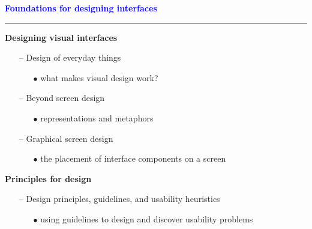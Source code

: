 \documentclass[pdf]{beamer}
\begin{document}
{{{{{{{{
\begin{frame}
	\vspace{8mm}
	\textcolor{Blue}{\textbf{\Large{Foundations for designing interfaces}}}
    \textcolor{red}{\rule{10cm}{1mm}}
    
    \bigskip
    \textbf {Designing visual interfaces}

    \begin{itemize}
    	\item[{--}] Design of everyday things
        \begin{itemize}
        	\item[{$\bullet$}] what makes visual design work?
     	\end{itemize}
        \item[{--}] Beyond screen design
         \begin{itemize}
        	\item[{$\bullet$}] representations and metaphors
     	\end{itemize}
          \item[{--}] Graphical screen design
         \begin{itemize}
        	\item[{$\bullet$}] the placement of interface components on a screen
     	\end{itemize}
   	\end{itemize}
     	\bigskip
     	\textbf {Principles for design}
		\begin{itemize}
        \item[{--}] Design principles, guidelines, and usability heuristics 
        \begin{itemize}
        	\item[{$\bullet$}] using guidelines to design and discover usability problems
        \end{itemize}
	\end{itemize}
\end{frame}}



}}}}}}}
\end{document}
